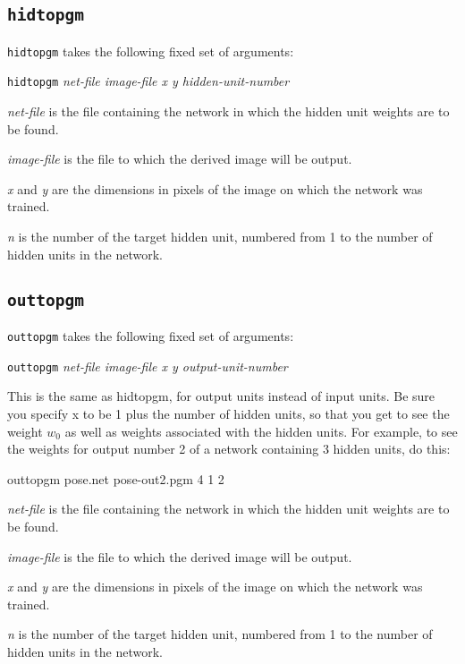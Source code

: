 \subsection {\tt hidtopgm}

{\tt hidtopgm} takes the following fixed set of arguments:

{\tt hidtopgm} {\it net-file image-file x y hidden-unit-number}

\begin{description}

\item {\it net-file} is the file containing the network in which
the hidden unit weights are to be found.

\item {\it image-file} is the file to which the derived image will
be output.

\item {\it x} and {\it y} are the dimensions in pixels of the image
on which the network was trained.

\item {\it n} is the number of the target hidden unit, numbered from
1 to the number of hidden units in the network.

\end{description}

\subsection {\tt outtopgm}

{\tt outtopgm} takes the following fixed set of arguments:

{\tt outtopgm} {\it net-file image-file x y output-unit-number}

\begin{description}
\item This is the same as hidtopgm, for output units instead of input units.
Be sure you specify x to be 1 plus the number of hidden units, so that you get
to see the weight $w_{0}$ as well as weights associated with the hidden units.
For example, to see the weights for output number 2 of a network containing 3
hidden units, do this:

outtopgm pose.net pose-out2.pgm 4 1 2

\item {\it net-file} is the file containing the network in which
the hidden unit weights are to be found.

\item {\it image-file} is the file to which the derived image will
be output.

\item {\it x} and {\it y} are the dimensions in pixels of the image
on which the network was trained.

\item {\it n} is the number of the target hidden unit, numbered from
1 to the number of hidden units in the network.

\end{description}


